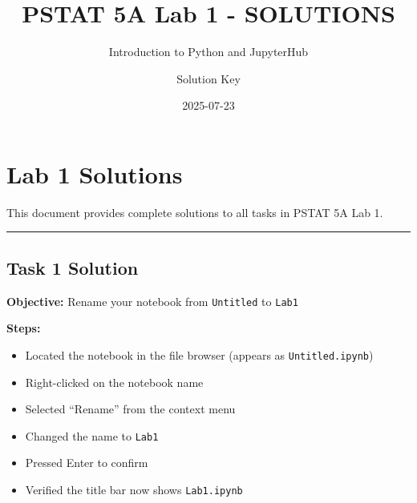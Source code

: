 \documentclass[
  11pt,
]{article}
\title{PSTAT 5A Lab 1 - SOLUTIONS}
\subtitle{Introduction to Python and JupyterHub}
\author{Solution Key}
\date{2025-07-23}
\renewcommand*\contentsname{Table of contents}
\newcommand\contentsname{Table of contents}
\begin{document}
\maketitle

\renewcommand*\contentsname{Table of contents}
{
\hypersetup{linkcolor=}
\setcounter{tocdepth}{3}
\tableofcontents
}


\section{Lab 1 Solutions}\label{lab-1-solutions}

This document provides complete solutions to all tasks in PSTAT 5A Lab
1.

\begin{center}\rule{0.5\linewidth}{0.5pt}\end{center}

\subsection{Task 1 Solution}\label{task-1-solution}

\textbf{Objective:} Rename your notebook from \texttt{Untitled} to
\texttt{Lab1}

\textbf{Steps:}

\begin{itemize}
\item
  Located the notebook in the file browser (appears as
  \texttt{Untitled.ipynb})
\item
  Right-clicked on the notebook name
\item
  Selected ``Rename'' from the context menu
\item
  Changed the name to \texttt{Lab1}
\item
  Pressed Enter to confirm
\item
  Verified the title bar now shows \texttt{Lab1.ipynb}
\end{itemize}
\end{document}
